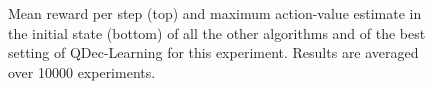 \documentclass[conference]{IEEEtran}
\begin{document}
\begin{figure}[t]
\begin{minipage}{\columnwidth}
\centering
  \hspace{-.5cm}
\end{minipage}
  \caption{Mean reward per step (top) and maximum action-value estimate in the initial state (bottom) of all the other algorithms and of the best setting of QDec-Learning for this experiment. Results are averaged over 10000 experiments.}
  \label{F:hasselt_all}
\end{figure}
\end{document}
